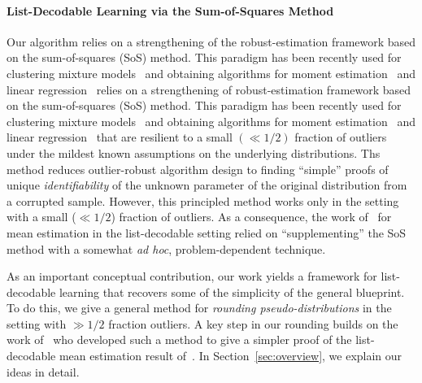 \documentclass{article}
\theoremstyle{definition}
\theoremstyle{remark}
\numberwithin{equation}{section}
\newcommand{\1}{\bm{1}}
\begin{document}



\paragraph{List-Decodable Learning via the Sum-of-Squares Method} Our algorithm relies on a strengthening of the robust-estimation framework based on the sum-of-squares (SoS) method. This paradigm has been recently used for clustering mixture models~\cite{HopkinsLi17,KothariSteinhardt17} and obtaining algorithms for moment estimation~\cite{2017KS} and linear regression~\cite{DBLP:conf/colt/KlivansKM18}
relies on a strengthening of robust-estimation framework based on the sum-of-squares (SoS) method. This paradigm has been recently used for clustering mixture models~\cite{HopkinsLi17,KothariSteinhardt17} and obtaining algorithms for moment estimation~\cite{2017KS} and linear regression~\cite{DBLP:conf/colt/KlivansKM18} that are resilient to a small $(\ll 1/2)$ fraction of outliers under the mildest known assumptions on the underlying distributions. Ths method reduces outlier-robust algorithm design to finding ``simple'' proofs of  unique \emph{identifiability} of the unknown parameter of the original distribution from a corrupted sample. However, this principled method works only in the setting with a small ($\ll 1/2$) fraction of outliers. As a consequence, the work of~\cite{KothariSteinhardt17} for mean estimation in the list-decodable setting relied on ``supplementing'' the SoS method with a somewhat \emph{ad hoc}, problem-dependent technique. 

As an important conceptual contribution, our work yields a framework for list-decodable learning that recovers some of the simplicity of the general blueprint. To do this, we give a general method for \emph{rounding pseudo-distributions} in the setting with $\gg 1/2$ fraction outliers. A key step in our rounding builds on the work of~\cite{KS19} who developed such a method to give a simpler proof of the list-decodable mean estimation result of~\cite{KothariSteinhardt17}. In Section~\ref{sec:overview}, we explain our ideas in detail. 
\end{document}
